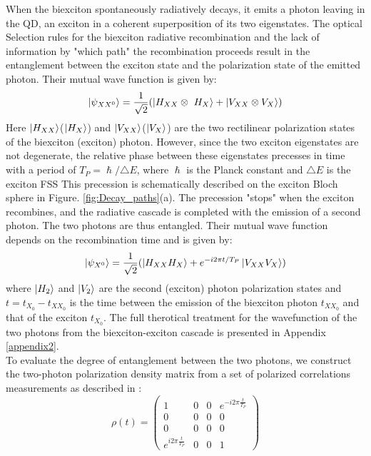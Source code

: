 	When the biexciton spontaneously radiatively decays, it  emits a photon leaving 
	in the QD, an exciton in a coherent superposition of its two eigenstates. The optical
	Selection rules for the biexciton radiative recombination and the lack of information by "which path" the recombination proceeds result in the entanglement between the exciton state and the polarization state of the emitted photon. Their mutual wave function is given by:
	\begin{equation}
		\ket{\psi_{XX^0}} = \frac{1}{\sqrt{2}}(\ket{H_{XX}\otimes\ H_{X}} +\ket{V_{XX} \otimes V_{X}})
	\end{equation}
	Here $\ket{H_{XX}}$($\ket{H_{X}}$) and $\ket{V_{XX}}$($\ket{V_{X}}$) are the two rectilinear polarization states of the biexciton (exciton) photon. However, since the two exciton eigenstates are not degenerate, the relative phase between these eigenstates precesses in time with a period of $T_P = \hslash /\triangle E$, where $\hslash$ is the Planck constant and $\triangle E$ is the exciton FSS \cite{Winik2017}
	This precession is schematically described on the exciton Bloch sphere in Figure. \ref{fig:Decay_paths}(a).
	The precession "stops" when the exciton recombines, and the radiative cascade is completed with the emission of a second photon. The two photons are thus entangled. Their mutual wave function depends on the recombination time and is given by:
	\begin{equation}
		\ket{\psi_{X^0}} = \frac{1}{\sqrt{2}}(\ket{H_{XX}H_{X}} +e^{-i2\pi t/T_P}\ket{V_{XX}V_X})
	\end{equation}
	where $\ket{H_2}$ and $\ket{V_2}$ are the second (exciton) photon polarization states and $t = t_{X_0} - t_{{XX}_0}$ is the time between the emission of the biexciton photon $t_{{XX}_0}$ and that of the exciton $t_{X_0}$. The full therotical treatment for the wavefunction of the two photons from the biexciton-exciton cascade is presented in Appendix \ref{appendix2}.\\
   To evaluate the degree of entanglement between the two photons, we construct the two-photon polarization density matrix from a set of polarized correlations measurements as described in \cite{Kiwat2001}:
   \begin{equation}
   \rho(t) = 
       \begin{pmatrix}
1 & 0 & 0 & e^{-i2\pi \frac{t}{T_P}}\\
0 & 0 & 0 & 0 \\
0 & 0 & 0 & 0 \\
e^{i2\pi \frac{t}{T_P}} & 0 & 0 & 1 
\end{pmatrix}
   \end{equation}

